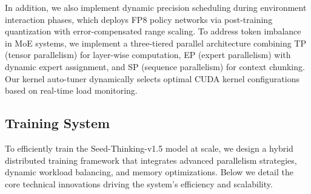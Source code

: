 In addition, we also implement dynamic precision scheduling during environment interaction phases, which deploys FP8 policy networks via post-training quantization with error-compensated range scaling. %
To address token imbalance in MoE systems, we implement a three-tiered parallel architecture combining TP (tensor parallelism) for layer-wise computation, EP (expert parallelism) with dynamic expert assignment, and SP (sequence parallelism) for context chunking. Our kernel auto-tuner dynamically selects optimal CUDA kernel configurations based on real-time load monitoring.


\subsection{Training System}

To efficiently train the Seed-Thinking-v1.5 model at scale, we design a hybrid distributed training framework that integrates advanced parallelism strategies, dynamic workload balancing, and memory optimizations. Below we detail the core technical innovations driving the system’s efficiency and scalability.


